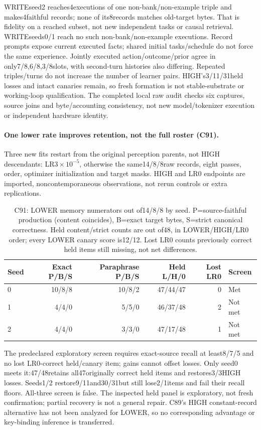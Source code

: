 \documentclass{article}
\begin{document}
WRITEseed2 reaches4executions of one non-bank/non-example triple and makes4faithful records;
none of its8records matches old-target bytes. That is fidelity on a reached
subset, not new independent tasks or causal retrieval. WRITEseeds0/1 reach no
such non-bank/non-example executions. Record prompts expose current executed
facts; shared initial tasks/schedule do not force the same experience. Jointly
executed action/outcome/prior agree in only7/8,6/8,3/8slots, with second-turn
histories also differing. Repeated triples/turns do not increase the number of
learner pairs. HIGH's3/11/31held losses and intact canaries remain, so fresh
formation is not stable-substrate or working-loop qualification. The completed
local raw audit checks six captures, source joins and byte/accounting consistency,
not new model/tokenizer execution or independent hardware identity. 

\paragraph{One lower rate improves retention, not the full roster (C91).}
Three new fits restart from the original perception parents, not HIGH descendants:
LR$3\times10^{-5}$, otherwise the same14/8/8raw records, eight passes, order,
optimizer initialization and target masks. HIGH and LR0 endpoints are imported,
noncontemporaneous observations, not rerun controls or extra replications.
\begin{table}[htbp]
\centering\small
\begin{tabular}{lrrrrl}
\toprule
Seed & Exact P/B/S & Paraphrase P/B/S & Held L/H/0 & Lost LR0 & Screen \\
\midrule
0 & 10/8/8 & 10/8/2 & 47/44/47 & 0 & Met \\
1 & 4/4/0 & 5/5/0 & 46/37/48 & 2 & Not met \\
2 & 4/4/0 & 3/3/0 & 47/17/48 & 1 & Not met \\
\bottomrule
\end{tabular}
\caption{C91: LOWER memory numerators out of14/8/8 by seed.
P=source-faithful production (content coincides), B=exact target bytes,
S=strict canonical correctness. Held content/strict counts are out of48,
in LOWER/HIGH/LR0 order; every LOWER canary score is12/12. Lost LR0 counts
previously correct held items still missing, not net differences.}
\label{tab:seq155-repair}
\end{table}
The predeclared exploratory screen requires exact-source recall at least8/7/5
and no lost LR0-correct held/canary item; gains cannot offset losses. Only seed0
meets it:47/48retains all47originally correct held items and restores3/3HIGH
losses. Seeds1/2 restore9/11and30/31but still lose2/1items and fail their recall
floors. All-three screen is false. The inspected held panel is exploratory,
not fresh confirmation; partial recovery is not a general repair. C89's
HIGH constant-record alternative has not been analyzed for LOWER, so no
corresponding advantage or key-binding inference is transferred. 
\end{document}
